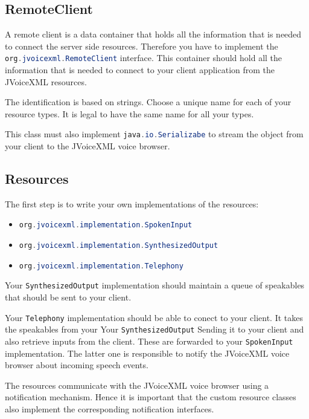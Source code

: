 \documentclass[11pt,a4paper]{article}
\begin{document}
\subsection{RemoteClient}

A remote client is a data container that holds all the information that is
needed to connect the server side resources. Therefore you have to implement
the \lstinline[language=Java]{org.jvoicexml.RemoteClient} interface. This
container should hold all the information that is needed to connect to your
client application from the JVoiceXML resources.

The identification is based on strings. Choose a unique name for each of your
resource types. It is legal to have the same name for all your types.

This class must also implement \lstinline[language=Java]{java.io.Serializabe}
to stream the object from your client to the JVoiceXML voice browser.

\subsection{Resources}

The first step is to write your own implementations of the resources:
\begin{itemize}
  \item \lstinline[language=Java]{org.jvoicexml.implementation.SpokenInput}
  \item
  \lstinline[language=Java]{org.jvoicexml.implementation.SynthesizedOutput}
  \item \lstinline[language=Java]{org.jvoicexml.implementation.Telephony}
\end{itemize}

Your \lstinline[language=Java]{SynthesizedOutput} implementation should maintain
a queue of speakables that should be sent to your client.

Your \lstinline[language=Java]{Telephony} implementation should be able to
conect to your client. It takes the speakables from your Your
\lstinline[language=Java]{SynthesizedOutput} Sending it to your client and also
retrieve inputs from the client. These are forwarded to your 
\lstinline[language=Java]{SpokenInput} implementation. The latter one is
responsible to notify the JVoiceXML voice browser about incoming speech events.

 
The resources communicate with
the JVoiceXML voice browser using a notification mechanism. Hence it is important that the custom resource classes also
implement the corresponding notification interfaces.
\end{document}
